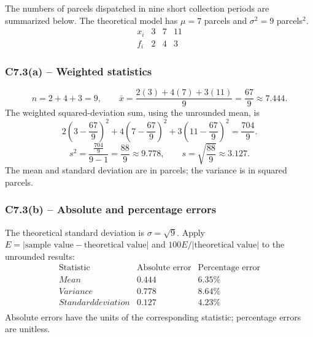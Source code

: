 {
The numbers of parcels dispatched in nine short collection periods are summarized below.
The theoretical model has $\mu=7$ parcels and $\sigma^2=9$ parcels$^2$.
\[
\begin{array}{c|rrr}x_i&3&7&11\\\hline f_i&2&4&3\end{array}
\]
\label{sol:c7-3a}
\subsubsection*{C7.3(a) -- Weighted statistics }
\[
n=2+4+3=9,\qquad
\bar{x}=\frac{2(3)+4(7)+3(11)}{9}=\frac{67}{9}\approx7.444.
\]
The weighted squared-deviation sum, using the unrounded mean, is
\[
2\left(3-\frac{67}{9}\right)^2+4\left(7-\frac{67}{9}\right)^2+3\left(11-\frac{67}{9}\right)^2=\frac{704}{9}.
\]
\[
s^2=\frac{\frac{704}{9}}{9-1}=\frac{88}{9}\approx9.778,\qquad
s=\sqrt{\frac{88}{9}}\approx3.127.
\]
The mean and standard deviation are in parcels; the variance is in squared parcels.

\label{sol:c7-3b}
\subsubsection*{C7.3(b) -- Absolute and percentage errors }
The theoretical standard deviation is $\sigma=\sqrt{9}$.
Apply $E=|\text{sample value}-\text{theoretical value}|$ and
$100E/|\text{theoretical value}|$ to the unrounded results:
\[
\begin{array}{l|rr}
\text{Statistic}&\text{Absolute error}&\text{Percentage error}\\\hline
Mean&0.444&6.35\%\\
Variance&0.778&8.64\%\\
Standard deviation&0.127&4.23\%\\
\end{array}
\]
Absolute errors have the units of the corresponding statistic; percentage errors are unitless.
\secInicio[sec:c7-3]

}

